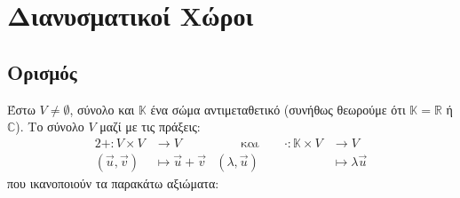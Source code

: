 


\usepackage{xspace}
\pagestyle{vangelis}





\chapter{Διανυσματικοί Χώροι}


\section{Ορισμός}

\begin{dfn}
\item {}
    Έστω $V \neq \emptyset $, σύνολο και $\mathbb{K}$ ένα σώμα αντιμεταθετικό 
    (συνήθως θεωρούμε ότι $ \mathbb{K} = \mathbb{R} $ ή $\mathbb{C}$). 
    Το σύνολο $V$ μαζί με τις πράξεις:
    \begin{alignat*}{2}
        + \colon V \times V &\to V & \qquad \text{και} \qquad \cdot \colon \mathbb{K} 
        \times V &\to V \\ ( \vec{u}, \vec{v} ) &\mapsto \vec{u} + \vec{v} 
                 & ( \lambda, \vec{u} ) &\mapsto \lambda \vec{u} 
    \end{alignat*}
    \vspace{\baselineskip}
    που ικανοποιούν τα παρακάτω αξιώματα:


\end{dfn}
